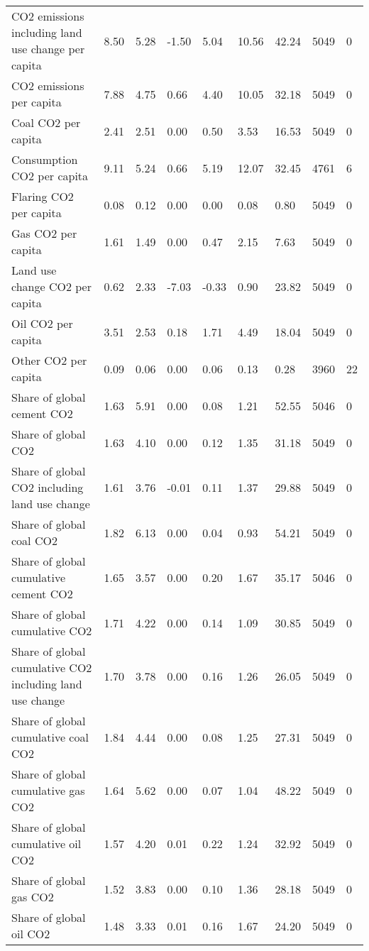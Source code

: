 \begin{longtable}{lllllllll}
CO2 emissions including land use change per capita & 8.50 & 5.28 & -1.50 & 5.04 & 10.56 & 42.24 & 5049 & 0\\
CO2 emissions per capita & 7.88 & 4.75 & 0.66 & 4.40 & 10.05 & 32.18 & 5049 & 0\\
Coal CO2 per capita & 2.41 & 2.51 & 0.00 & 0.50 & 3.53 & 16.53 & 5049 & 0\\
\addlinespace
Consumption CO2 per capita & 9.11 & 5.24 & 0.66 & 5.19 & 12.07 & 32.45 & 4761 & 6\\
Flaring CO2 per capita & 0.08 & 0.12 & 0.00 & 0.00 & 0.08 & 0.80 & 5049 & 0\\
Gas CO2 per capita & 1.61 & 1.49 & 0.00 & 0.47 & 2.15 & 7.63 & 5049 & 0\\
Land use change CO2 per capita & 0.62 & 2.33 & -7.03 & -0.33 & 0.90 & 23.82 & 5049 & 0\\
Oil CO2 per capita & 3.51 & 2.53 & 0.18 & 1.71 & 4.49 & 18.04 & 5049 & 0\\
\addlinespace
Other CO2 per capita & 0.09 & 0.06 & 0.00 & 0.06 & 0.13 & 0.28 & 3960 & 22\\
Share of global cement CO2 & 1.63 & 5.91 & 0.00 & 0.08 & 1.21 & 52.55 & 5046 & 0\\
Share of global CO2 & 1.63 & 4.10 & 0.00 & 0.12 & 1.35 & 31.18 & 5049 & 0\\
Share of global CO2 including land use change & 1.61 & 3.76 & -0.01 & 0.11 & 1.37 & 29.88 & 5049 & 0\\
Share of global coal CO2 & 1.82 & 6.13 & 0.00 & 0.04 & 0.93 & 54.21 & 5049 & 0\\
\addlinespace
Share of global cumulative cement CO2 & 1.65 & 3.57 & 0.00 & 0.20 & 1.67 & 35.17 & 5046 & 0\\
Share of global cumulative CO2 & 1.71 & 4.22 & 0.00 & 0.14 & 1.09 & 30.85 & 5049 & 0\\
Share of global cumulative CO2 including land use change & 1.70 & 3.78 & 0.00 & 0.16 & 1.26 & 26.05 & 5049 & 0\\
Share of global cumulative coal CO2 & 1.84 & 4.44 & 0.00 & 0.08 & 1.25 & 27.31 & 5049 & 0\\
Share of global cumulative gas CO2 & 1.64 & 5.62 & 0.00 & 0.07 & 1.04 & 48.22 & 5049 & 0\\
\addlinespace
Share of global cumulative oil CO2 & 1.57 & 4.20 & 0.01 & 0.22 & 1.24 & 32.92 & 5049 & 0\\
Share of global gas CO2 & 1.52 & 3.83 & 0.00 & 0.10 & 1.36 & 28.18 & 5049 & 0\\
Share of global oil CO2 & 1.48 & 3.33 & 0.01 & 0.16 & 1.67 & 24.20 & 5049 & 0\\

\end{longtable}

